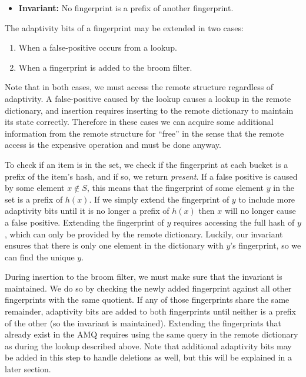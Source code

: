 \documentclass[../paper.tex]{subfiles}
\begin{document}
\begin{itemize}
    \item[] \textbf{Invariant:} No fingerprint is a prefix of another fingerprint.
\end{itemize}

The adaptivity bits of a fingerprint may be extended in two cases:

\begin{enumerate}
    \item When a false-positive occurs from a lookup.
    \item When a fingerprint is added to the broom filter.
\end{enumerate}

Note that in both cases, we must access the remote structure regardless of adaptivity. A false-positive
caused by the lookup causes a lookup in the remote dictionary, and insertion requires inserting
to the remote dictionary to maintain its state correctly. Therefore in these cases we can
acquire some additional information from the remote structure for ``free'' in the sense that
the remote access is the expensive operation and must be done anyway.

To check if an item is in the set, we check if the fingerprint at each bucket is a prefix
of the item's hash, and if so, we return \textit{present}. 
If a false positive is caused by some element $x \notin S$, this means that
the fingerprint of some element $y$ in the set is a prefix of $h(x)$. If we
simply extend the fingerprint of $y$ to include more adaptivity bits until
it is no longer a prefix of $h(x)$ then $x$ will no longer cause a false positive. Extending
the fingerprint of $y$ requires accessing the full hash of $y$, which can only be
provided by the remote dictionary. Luckily, our invariant ensures that there is
only one element in the dictionary with $y$'s fingerprint, so we can find the unique
$y$.

During insertion to the broom filter, we must make sure that the invariant is maintained.
We do so by checking the newly added fingerprint against all other fingerprints with
the same quotient. If any of those fingerprints share the same remainder, adaptivity bits are
added to both fingerprints until neither is a prefix of the other (so the invariant
is maintained). Extending the fingerprints that already exist in the AMQ requires using
the same query in the remote dictionary as during the lookup described above. Note that additional
adaptivity bits may be added in this step to handle deletions as well, but this will be
explained in a later section.
\end{document}

